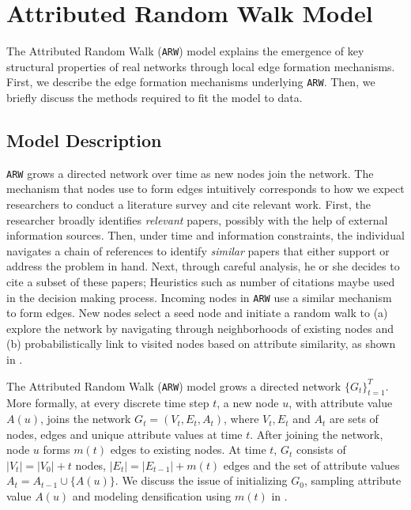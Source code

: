 
\section{Attributed Random Walk Model}
\label{sec:Proposed Model}
The Attributed Random Walk (\texttt{ARW}) model explains the emergence
of key structural properties of real networks through local edge formation mechanisms.
First, we describe the edge formation mechanisms underlying \texttt{ARW}. Then,
we briefly discuss the methods required to fit the model to data.


\subsection{Model Description}
\label{sub:Model Description}

\texttt{ARW} grows a directed network over time as new nodes join the network.
The mechanism that nodes use to form edges intuitively corresponds to how we
expect researchers to conduct a literature survey and cite relevant work.
First, the researcher broadly identifies \textit{relevant} papers,
possibly with the help of external information sources.
Then, under time and information constraints, the individual navigates a chain
of references to identify \textit{similar} papers that either support or
address the problem in hand.  Next, through careful analysis, he or she
decides to cite a subset of these papers; Heuristics such as number of
citations maybe used in the decision making process.
Incoming nodes in \texttt{ARW} use a similar mechanism to form edges.
New nodes select a seed node and initiate a random walk to (a) explore the network
by navigating through neighborhoods of existing nodes and (b) probabilistically
link to visited nodes based on attribute similarity, as shown in .

The Attributed Random Walk (\texttt{ARW}) model grows a directed network $\{G_t\}^T_{t=1}$.
More formally, at every discrete time step $t$, a
new node $u$, with attribute value $A(u)$, joins the network $G_t=(V_t, E_t,
A_t)$, where $V_t, E_t$ and $A_t$ are sets of nodes, edges and unique attribute
values at time $t$. After joining the network, node $u$ forms $m(t)$ edges to
existing nodes. At time $t$, $G_t$ consists of ${|V_t|=|V_0|+t}$ nodes,
${|E_t|=|E_{t-1}|+m(t)}$ edges and the set of attribute values ${A_t = A_{t-1}
\cup \{A(u)\}}$.
We discuss the
issue of initializing $G_0$, sampling attribute value $A(u)$ and modeling
densification using $m(t)$ in .

